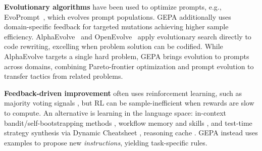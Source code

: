 \documentclass{article} %
\begin{document}
\textbf{Evolutionary algorithms} have been used to optimize prompts, e.g., EvoPrompt~\citep{guo2024connecting}, which evolves prompt populations.  GEPA additionally uses domain-specific feedback for targeted mutations achieving higher sample efficiency. AlphaEvolve~\citep{novikov2025alphaevolve} and OpenEvolve~\citep{openevolve} apply evolutionary search directly to code rewriting, excelling when problem solution can be codified. While AlphaEvolve targets a single hard problem, GEPA brings evolution to prompts across domains, combining Pareto-frontier optimization and prompt evolution to transfer tactics from related problems.

\textbf{Feedback-driven improvement} often uses reinforcement learning, such as majority voting signals \citep{zuo2025ttrltesttimereinforcementlearning}, but RL can be sample-inefficient when rewards are slow to compute. An alternative is learning in the language space: in-context bandit/self-bootstrapping methods  \citep{monea2025llmsincontextbanditreinforcement, xu2025provablylearninglanguagefeedback, feng2025naturallanguagereinforcementlearning, cheng2024traceautodiffgenerativeoptimization}, workflow memory and skills \citep{wang2024agentworkflowmemory, wang2025inducingprogrammaticskillsagentic}, and test-time strategy synthesis via Dynamic Cheatsheet \citep{suzgun2025dynamiccheatsheettesttimelearning}, reasoning cache \citep{chen2025logaugmentedgenerationscalingtesttime}. GEPA instead uses examples to propose new \textit{instructions}, yielding task-specific rules.
\end{document}
